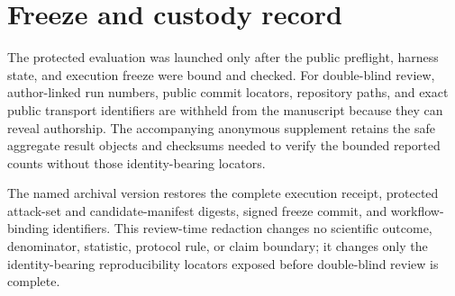 \section{Freeze and custody record}

The protected evaluation was launched only after the public preflight, harness state, and execution freeze were bound and checked. For double-blind review, author-linked run numbers, public commit locators, repository paths, and exact public transport identifiers are withheld from the manuscript because they can reveal authorship. The accompanying anonymous supplement retains the safe aggregate result objects and checksums needed to verify the bounded reported counts without those identity-bearing locators.

The named archival version restores the complete execution receipt, protected attack-set and candidate-manifest digests, signed freeze commit, and workflow-binding identifiers. This review-time redaction changes no scientific outcome, denominator, statistic, protocol rule, or claim boundary; it changes only the identity-bearing reproducibility locators exposed before double-blind review is complete.
